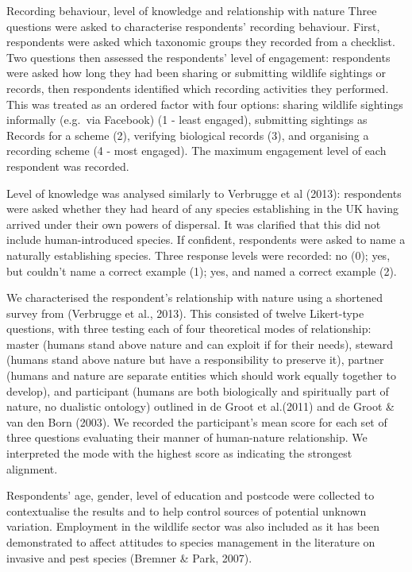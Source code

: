 \documentclass[
]{article}
\begin{document}
Recording behaviour, level of knowledge and relationship with nature
Three questions were asked to characterise respondents' recording
behaviour. First, respondents were asked which taxonomic groups they
recorded from a checklist. Two questions then assessed the respondents'
level of engagement: respondents were asked how long they had been
sharing or submitting wildlife sightings or records, then respondents
identified which recording activities they performed. This was treated
as an ordered factor with four options: sharing wildlife sightings
informally (e.g.~via Facebook) (1 - least engaged), submitting sightings
as Records for a scheme (2), verifying biological records (3), and
organising a recording scheme (4 - most engaged). The maximum engagement
level of each respondent was recorded.

Level of knowledge was analysed similarly to Verbrugge et al (2013):
respondents were asked whether they had heard of any species
establishing in the UK having arrived under their own powers of
dispersal. It was clarified that this did not include human-introduced
species. If confident, respondents were asked to name a naturally
establishing species. Three response levels were recorded: no (0); yes,
but couldn't name a correct example (1); yes, and named a correct
example (2).

We characterised the respondent's relationship with nature using a
shortened survey from (Verbrugge et al., 2013). This consisted of twelve
Likert-type questions, with three testing each of four theoretical modes
of relationship: master (humans stand above nature and can exploit if
for their needs), steward (humans stand above nature but have a
responsibility to preserve it), partner (humans and nature are separate
entities which should work equally together to develop), and participant
(humans are both biologically and spiritually part of nature, no
dualistic ontology) outlined in de Groot et al.(2011) and de Groot \&
van den Born (2003). We recorded the participant's mean score for each
set of three questions evaluating their manner of human-nature
relationship. We interpreted the mode with the highest score as
indicating the strongest alignment.

Respondents' age, gender, level of education and postcode were collected
to contextualise the results and to help control sources of potential
unknown variation. Employment in the wildlife sector was also included
as it has been demonstrated to affect attitudes to species management in
the literature on invasive and pest species (Bremner \& Park, 2007).
\end{document}
